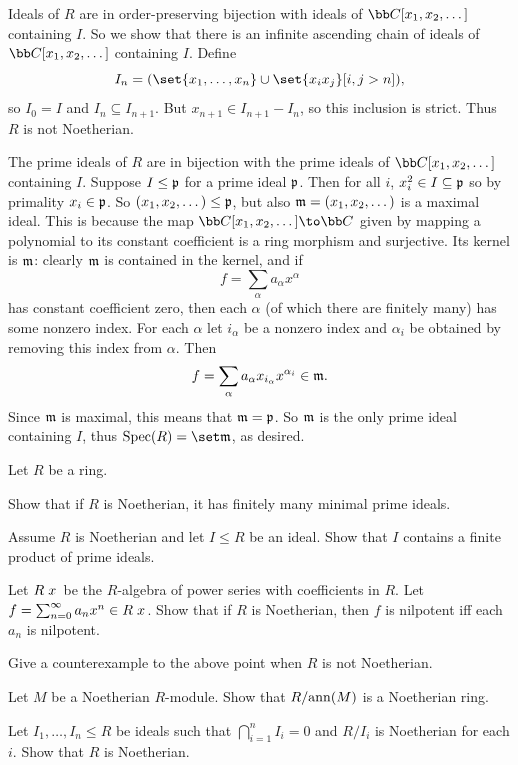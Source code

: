     \item Ideals of $R$ are in order-preserving bijection with ideals of $\bC[x_1,x_2,\dots]$ containing $I$.
    So we show that there is an infinite ascending chain of ideals of $\bC[x_1,x_2,\dots]$ containing $I$.
    Define
    $$ I_n = (\set{x_1,\dots,x_n}\cup\set{x_ix_j}[i,j>n]) , $$
    so $I_0=I$ and $I_n\subseteq I_{n+1}$.
    But $x_{n+1}\in I_{n+1}-I_n$, so this inclusion is strict.
    Thus $R$ is not Noetherian.

    The prime ideals of $R$ are in bijection with the prime ideals of $\bC[x_1,x_2,\dots]$ containing $I$.
    Suppose $I\leq{{\frak p}}$ for a prime ideal ${{\frak p}}$.
    Then for all $i$, $x_i^2\in I\subseteq{{\frak p}}$ so by primality $x_i\in{{\frak p}}$.
    So $(x_1,x_2,\dots)\leq{{\frak p}}$, but also ${{\frak m}}=(x_1,x_2,\dots)$ is a maximal ideal.
    This is because the map $\bC[x_1,x_2,\dots]\to\bC$ given by mapping a polynomial to its constant coefficient is
    a ring morphism and surjective.
    Its kernel is ${{\frak m}}$: clearly ${{\frak m}}$ is contained in the kernel, and if
    $$ f = \sum_\alpha a_\alpha x^\alpha $$
    has constant coefficient zero, then each $\alpha$ (of which there are finitely many) has some nonzero index.
    For each $\alpha$ let $i_\alpha$ be a nonzero index and $\alpha_i$ be obtained by removing this index from $\alpha$.
    Then
    $$ f = \sum_\alpha a_\alpha x_{i_\alpha}x^{\alpha_i} \in {{\frak m}} . $$
    Since ${{\frak m}}$ is maximal, this means that ${{\frak m}}={{\frak p}}$.
    So ${{\frak m}}$ is the only prime ideal containing $I$, thus $\spec(R)=\set\m$, as desired.
\eenum

\bprob

    Let $R$ be a ring.
    \benum
        \item Show that if $R$ is Noetherian, it has finitely many minimal prime ideals.
        \item Assume $R$ is Noetherian and let $I\leq R$ be an ideal.
        Show that $I$ contains a finite product of prime ideals.
        \item Let $R\bbracks x$ be the $R$-algebra of power series with coefficients in $R$.
        Let $f=\sum_{n=0}^\infty a_nx^n\in R\bbracks x$.
        Show that if $R$ is Noetherian, then $f$ is nilpotent iff each $a_n$ is nilpotent.
        \item Give a counterexample to the above point when $R$ is not Noetherian.
        \item Let $M$ be a Noetherian $R$-module.
        Show that $R/{\rm ann}(M)$ is a Noetherian ring.
        \item Let $I_1,\dots,I_n\leq R$ be ideals such that $\bigcap_{i=1}^nI_i=0$ and $R/I_i$ is Noetherian for each $i$.
        Show that $R$ is Noetherian.
    \eenum

